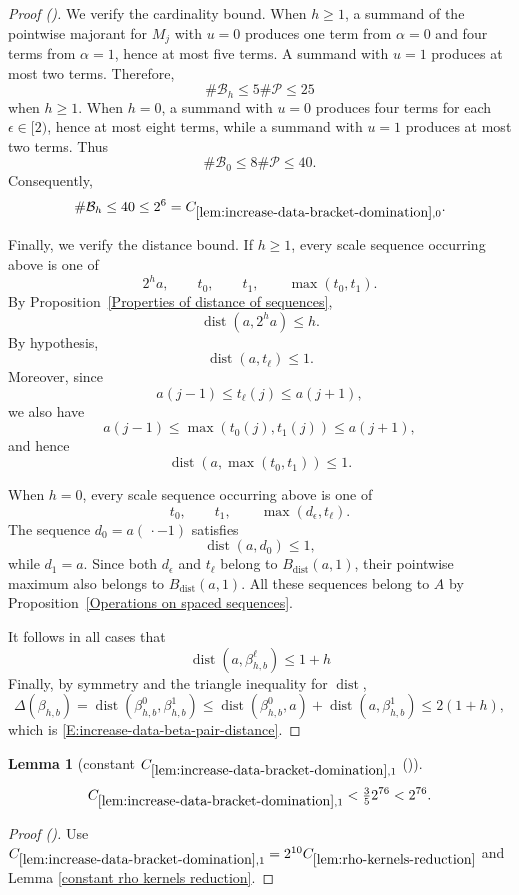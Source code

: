 \documentclass[12pt,reqno]{amsart}
\newcommand{\auto}{{({\tiny\faCar})}}
\theoremstyle{plain}
\newtheorem{lemma}[theorem]{Lemma}
\numberwithin{equation}{section}
\theoremstyle{remark}
\newcommand{\uses}[1]{}
\newcommand{\usesdefs}[1]{}
\DeclareMathOperator{\dist}{dist}
\begin{document}
\begin{proof}[Proof \auto]
We verify the cardinality bound. When \(h\geq1\), a summand of the
pointwise majorant for \(M_j\) with \(u=0\) produces one term from
\(\alpha=0\) and four terms from \(\alpha=1\), hence at most five
terms. A summand with \(u=1\) produces at most two terms. Therefore,
\[
\#\mathcal B_h
\leq
5\#\mathcal P
\leq
25
\]
when \(h\geq1\). When \(h=0\), a summand with \(u=0\) produces four
terms for each \(\epsilon\in[2)\), hence at most eight terms, while
a summand with \(u=1\) produces at most two terms. Thus
\[
\#\mathcal B_0
\leq
8\#\mathcal P
\leq
40.
\]
Consequently,
\[
\#\mathcal B_h
\leq
40
\leq
2^6
=
C_{\ref{lem:increase-data-bracket-domination},0}.
\]

Finally, we verify the distance bound. If \(h\geq1\), every scale
sequence occurring above is one of
\[
2^ha,\qquad
t_0,\qquad
t_1,\qquad
\max(t_0,t_1).
\]
By Proposition~\ref{Properties of distance of sequences},
\[
\dist(a,2^ha)\leq h.
\]
By hypothesis,
\[
\dist(a,t_\ell)\leq1.
\]
Moreover, since
\[
a(j-1)\leq t_\ell(j)\leq a(j+1),
\]
we also have
\[
a(j-1)
\leq
\max(t_0(j),t_1(j))
\leq
a(j+1),
\]
and hence
\[
\dist(a,\max(t_0,t_1))\leq1.
\]

When \(h=0\), every scale sequence occurring above is one of
\[
t_0,\qquad
t_1,\qquad
\max(d_\epsilon,t_\ell).
\]
The sequence \(d_0=a(\,\cdot-1)\) satisfies
\[
\dist(a,d_0)\leq1,
\]
while \(d_1=a\). Since both \(d_\epsilon\) and \(t_\ell\) belong to
\(B_{\dist}(a,1)\), their pointwise maximum also belongs to
\(B_{\dist}(a,1)\). All these sequences belong to \(A\) by
Proposition~\ref{Operations on spaced sequences}.

It follows in all cases that
\[
\dist(a,\beta_{h,b}^\ell)
\leq
1+h
\]
Finally, by symmetry and the triangle inequality for \(\dist\),
\[
\Delta(\beta_{h,b}) = \dist(\beta_{h,b}^0,\beta_{h,b}^1) \leq \dist(\beta_{h,b}^0,a) + \dist(a,\beta_{h,b}^1) \leq 2(1+h),
\]
which is
\eqref{E:increase-data-beta-pair-distance}.
\end{proof}

\begin{lemma}[constant $C_{\ref{lem:increase-data-bracket-domination},1}$ \auto]\label{constant increase data bracket domination}\uses{lem:increase-data-bracket-domination,lem:rho-kernels-reduction,constant rho kernels reduction}\usesdefs{}
\begin{equation}\label{constant increase data bracket domination bound}
C_{\ref{lem:increase-data-bracket-domination},1}
<\tfrac35 2^{76}<2^{76}.
\end{equation}
\end{lemma}
\begin{proof}[Proof \auto]
Use $C_{\ref{lem:increase-data-bracket-domination},1}=2^{10}C_{\ref{lem:rho-kernels-reduction}}$ and Lemma \ref{constant rho kernels reduction}.
\end{proof}
\end{document}
